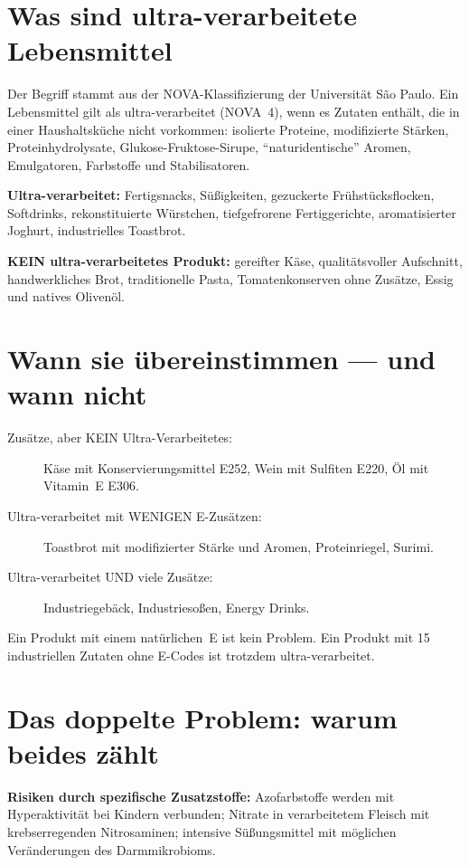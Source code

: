 \documentclass[a5paper,12pt,oneside,openany]{book}
\newcommand{\boxinfo}[2]{%
  \begin{tcolorbox}[kastenbase,
    colback=blauinfo!8!white, colframe=blauinfo, title={#1}]
  #2\end{tcolorbox}}
\begin{document}
\section{Was sind ultra-verarbeitete Lebensmittel}

Der Begriff stammt aus der NOVA-Klassifizierung der Universit\"{a}t S\~{a}o
Paulo. Ein Lebensmittel gilt als ultra-verarbeitet (NOVA~4), wenn es Zutaten
enth\"{a}lt, die in einer Haushaltsk\"{u}che nicht vorkommen: isolierte Proteine,
modifizierte St\"{a}rken, Proteinhydrolysate, Glukose-Fruktose-Sirupe,
``naturidentische'' Aromen, Emulgatoren, Farbstoffe und Stabilisatoren.

\textbf{Ultra-verarbeitet:} Fertigsnacks, S\"{u}{\ss}igkeiten, gezuckerte
Fr\"{u}hst\"{u}cksflocken, Softdrinks, rekonstituierte W\"{u}rstchen,
tiefgefrorene Fertiggerichte, aromatisierter Joghurt, industrielles Toastbrot.

\textbf{KEIN ultra-verarbeitetes Produkt:} gereifter K\"{a}se, qualit\"{a}tsvoller
Aufschnitt, handwerkliches Brot, traditionelle Pasta, Tomatenkonserven ohne
Zus\"{a}tze, Essig und natives Oliven\"{o}l.

\section{Wann sie \"{u}bereinstimmen --- und wann nicht}

\begin{description}
  \item[Zus\"{a}tze, aber KEIN Ultra-Verarbeitetes:] K\"{a}se mit
    Konservierungsmittel E252, Wein mit Sulfiten E220, \"{O}l mit
    Vitamin~E E306.
  \item[Ultra-verarbeitet mit WENIGEN E-Zus\"{a}tzen:] Toastbrot mit
    modifizierter St\"{a}rke und Aromen, Proteinriegel, Surimi.
  \item[Ultra-verarbeitet UND viele Zus\"{a}tze:] Industriegeb\"{a}ck,
    Industrieso{\ss}en, Energy Drinks.
\end{description}

\boxinfo{Fazit}{Ein Produkt mit einem nat\"{u}rlichen~E ist kein Problem. Ein
Produkt mit 15 industriellen Zutaten ohne E-Codes ist trotzdem
ultra-verarbeitet.}

\section{Das doppelte Problem: warum beides z\"{a}hlt}

\textbf{Risiken durch spezifische Zusatzstoffe:} Azofarbstoffe werden mit
Hyperaktivit\"{a}t bei Kindern verbunden; Nitrate in verarbeitetem Fleisch
mit krebserregenden Nitrosaminen; intensive S\"{u}{\ss}ungsmittel mit
m\"{o}glichen Ver\"{a}nderungen des Darmmikrobioms.
\end{document}
